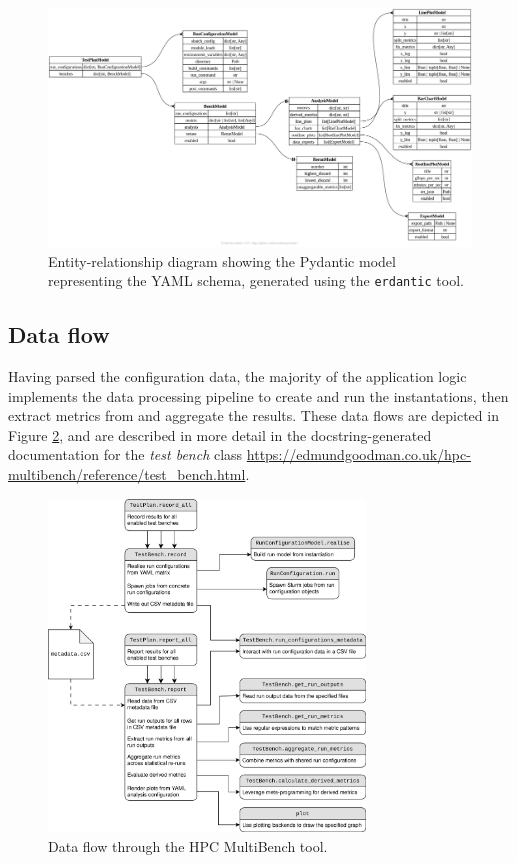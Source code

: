 \begin{figure}[H]
    \centering
    \includegraphics[width=\textwidth]{images/4_tooling/implementation/yaml_model.png}
    \caption{Entity-relationship diagram showing the Pydantic model representing the YAML schema, generated using the \texttt{erdantic} tool.}
    \label{fig:hpc-multibench-yaml-model}
\end{figure}

\subsection{Data flow}
\label{ssec:hpc-multibench-data-flow}

Having parsed the configuration data, the majority of the application logic implements the data processing pipeline to create and run the instantations, then extract metrics from and aggregate the results. These data flows are depicted in Figure \ref{fig:hpc-multibench-data-flow}, and are described in more detail in the docstring-generated documentation for the \textit{test bench} class \url{https://edmundgoodman.co.uk/hpc-multibench/reference/test_bench.html}.

\begin{figure}[H]
    \centering
    \includegraphics[width=0.75\textwidth]{images/4_tooling/implementation/hpc_multibench_data_flow.png}
    \caption{Data flow through the HPC MultiBench tool.}
    \label{fig:hpc-multibench-data-flow}
\end{figure}

